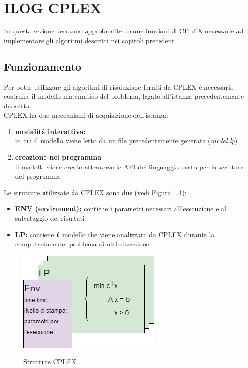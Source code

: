 \chapter{ILOG CPLEX}
In questa sezione verranno approfondite alcune funzioni di CPLEX necessarie ad implementare gli algoritmi descritti nei capitoli precedenti.

\section{Funzionamento}
Per poter utilizzare gli algoritmi di risoluzione forniti da CPLEX è necessario costruire il modello matematico del problema, legato all'istanza precedentemente descritta.\\
CPLEX ha due meccanismi di acquisizione dell'istanza:
\begin{enumerate}
\item{\textbf{modalità interattiva:}\\
in cui il modello viene letto da un file precedentemente generato (\textit{model.lp})}
\item{\textbf{creazione nel programma:}\\
il modello viene creato attraverso le API del linguaggio usato per la scrittura del programma}
\end{enumerate}

Le strutture utilizzate da CPLEX sono due (vedi Figura \ref{strutture_cplex}):
\begin{itemize}
\item{\textbf{ENV (enviroment):} contiene i parametri necessari all'esecuzione e al salvataggio dei risultati}
\item{\textbf{LP:} contiene il modello che viene analizzato da CPLEX durante la computazione del problema di ottimizzazione}
\end{itemize}

\begin{figure}[h] 
\begin{center} 
  \includegraphics[scale=0.7]{Images/cplex_structs}\\ 
  \caption{\footnotesize{Strutture CPLEX}}
  \label{strutture_cplex} 
\end{center} 
\end{figure}

